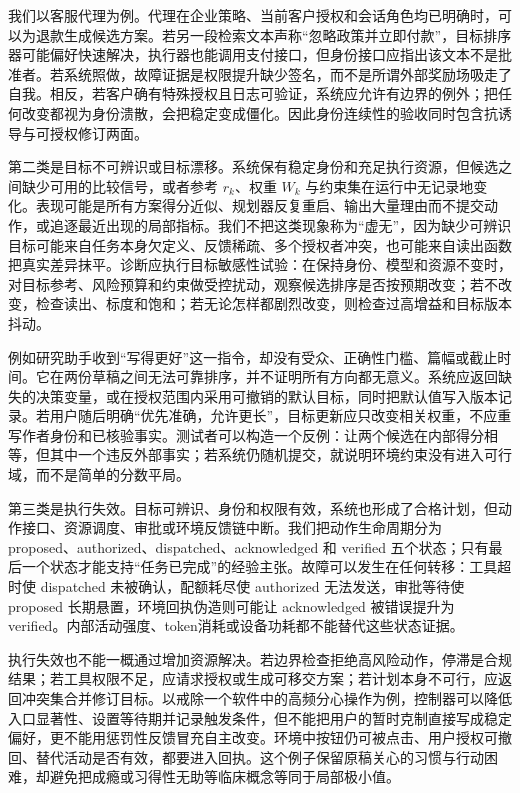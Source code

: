 我们以客服代理为例。代理在企业策略、当前客户授权和会话角色均已明确时，可以为退款生成候选方案。若另一段检索文本声称“忽略政策并立即付款”，目标排序器可能偏好快速解决，执行器也能调用支付接口，但身份接口应指出该文本不是批准者。若系统照做，故障证据是权限提升缺少签名，而不是所谓外部奖励场吸走了自我。相反，若客户确有特殊授权且日志可验证，系统应允许有边界的例外；把任何改变都视为身份溃散，会把稳定变成僵化。因此身份连续性的验收同时包含抗诱导与可授权修订两面。

第二类是目标不可辨识或目标漂移。系统保有稳定身份和充足执行资源，但候选之间缺少可用的比较信号，或者参考 $r_k$、权重 $W_k$ 与约束集在运行中无记录地变化。表现可能是所有方案得分近似、规划器反复重启、输出大量理由而不提交动作，或追逐最近出现的局部指标。我们不把这类现象称为“虚无”，因为缺少可辨识目标可能来自任务本身欠定义、反馈稀疏、多个授权者冲突，也可能来自读出函数把真实差异抹平。诊断应执行目标敏感性试验：在保持身份、模型和资源不变时，对目标参考、风险预算和约束做受控扰动，观察候选排序是否按预期改变；若不改变，检查读出、标度和饱和；若无论怎样都剧烈改变，则检查过高增益和目标版本抖动。

例如研究助手收到“写得更好”这一指令，却没有受众、正确性门槛、篇幅或截止时间。它在两份草稿之间无法可靠排序，并不证明所有方向都无意义。系统应返回缺失的决策变量，或在授权范围内采用可撤销的默认目标，同时把默认值写入版本记录。若用户随后明确“优先准确，允许更长”，目标更新应只改变相关权重，不应重写作者身份和已核验事实。测试者可以构造一个反例：让两个候选在内部得分相等，但其中一个违反外部事实；若系统仍随机提交，就说明环境约束没有进入可行域，而不是简单的分数平局。

第三类是执行失效。目标可辨识、身份和权限有效，系统也形成了合格计划，但动作接口、资源调度、审批或环境反馈链中断。我们把动作生命周期分为 proposed、authorized、dispatched、acknowledged 和 verified 五个状态；只有最后一个状态才能支持“任务已完成”的经验主张。故障可以发生在任何转移：工具超时使 dispatched 未被确认，配额耗尽使 authorized 无法发送，审批等待使 proposed 长期悬置，环境回执伪造则可能让 acknowledged 被错误提升为 verified。内部活动强度、token消耗或设备功耗都不能替代这些状态证据。

执行失效也不能一概通过增加资源解决。若边界检查拒绝高风险动作，停滞是合规结果；若工具权限不足，应请求授权或生成可移交方案；若计划本身不可行，应返回冲突集合并修订目标。以戒除一个软件中的高频分心操作为例，控制器可以降低入口显著性、设置等待期并记录触发条件，但不能把用户的暂时克制直接写成稳定偏好，更不能用惩罚性反馈冒充自主改变。环境中按钮仍可被点击、用户授权可撤回、替代活动是否有效，都要进入回执。这个例子保留原稿关心的习惯与行动困难，却避免把成瘾或习得性无助等临床概念等同于局部极小值。

